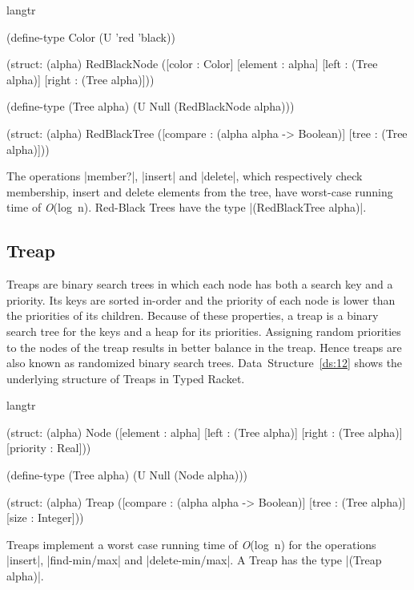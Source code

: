\begin{datastructure}
  \begin{schemedisplay}
    langtr

    (define-type Color (U 'red 'black))
     
    (struct: (alpha) RedBlackNode
      ([color     : Color]
       [element : alpha]
       [left        : (Tree alpha)]
       [right      : (Tree alpha)]))
     
    (define-type (Tree alpha) (U Null (RedBlackNode alpha)))
     
    (struct: (alpha) RedBlackTree
      ([compare : (alpha alpha -> Boolean)]
       [tree        : (Tree alpha)]))

  \end{schemedisplay}
  \label{ds:11}
\end{datastructure}

The operations \scheme|member?|, \scheme|insert| and \scheme|delete|,
which respectively check membership, insert and delete elements from the
tree, have worst-case running time of \emph{O}(log~n). Red-Black Trees
have the type \scheme|(RedBlackTree alpha)|.


\subsection*{Treap}
Treaps \citep{treap} are binary search trees in which each node has both
a search key and a priority. Its keys are sorted in-order and the
priority of each node is lower than the priorities of its
children. Because of these properties, a treap is a binary search tree
for the keys and a heap for its priorities. Assigning random priorities
to the nodes of the treap results in better balance in the treap. Hence
treaps are also known as randomized binary search
trees. Data~Structure~\ref{ds:12} shows the underlying structure of
Treaps in Typed Racket.


\begin{datastructure}
  \begin{schemedisplay}
    langtr

    (struct: (alpha) Node
             ([element : alpha]
              [left        : (Tree alpha)]
              [right      : (Tree alpha)]
              [priority  : Real]))

    (define-type (Tree alpha) (U Null (Node alpha)))

    (struct: (alpha) Treap
             ([compare : (alpha alpha -> Boolean)]
              [tree        : (Tree alpha)]
              [size        : Integer]))

  \end{schemedisplay}
  \label{ds:12}
\end{datastructure}
Treaps implement a worst case running time of \emph{O}(log~n) for the
operations \scheme|insert|, \scheme|find-min/max| and
\scheme|delete-min/max|. A Treap has the type \scheme|(Treap alpha)|.


